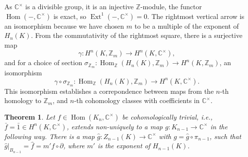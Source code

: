 \documentclass[a4paper, 10pt]{book}
\newtheorem{theorem}{Theorem}[chapter]
\theoremstyle{definition}
\numberwithin{equation}{chapter}
\newcommand\Hom{\operatorname{Hom}}
\newcommand\Ext{\operatorname{Ext}}
\newcommand\CC{\mathbb C}
\newcommand\ZZ{\mathbb Z}
\newcommand{\ra}\rightarrow
\begin{document}
 As $\CC^\times$ is a divisible group, it is an injective $\ZZ$-module, the functor $\Hom(-, \CC^\times)$ is exact, so $\Ext^1(-,\CC^\times) =0$. The rightmost vertical arrow is an isomorphism because we have chosen $m$ to be a multiple of the  exponent of $H_n(K)$. From the commutativity of the rightmost square, there is a surjective map \begin{equation}
 	\gamma: H^n(K, \ZZ _m)\rightarrow H^n(K, \CC^\times),
 \end{equation} and for a choice of section $\sigma_{\ZZ_m}: \Hom_{\ZZ}(H_n(K), \ZZ_m)\rightarrow H^n(K,\ZZ_m)$, an isomorphism \begin{equation}
 	\gamma\circ\sigma_{\ZZ_m}:\Hom_{\ZZ}(H_n(K), \ZZ_m)\rightarrow H^n(K, \CC^\times). \label{cohococycle}
 \end{equation} This isomorphism establishes a correpondence between maps from the $n$-th homology to $\ZZ_m$, and $n$-th cohomology classes with coefficients in $\CC^\times$.
\begin{theorem}\label{cochain}
Let $f\in \Hom(K_n,\CC^\times)$ be cohomologically trivial, i.e., $\bar{f} = \bar{1}\in H^n(K, \CC^\times) $,   extends non-uniquely to a map $g:K_{n-1} \rightarrow \CC^\times$ in the following way. There is a map $\hat{g}:Z_{n-1}(K)\ra \CC^\times$ with $g = \hat{g}\circ \pi_{n-1}$,  such that $\hat{g}|_{B_{n-1}} = \hat{f} = m'f\circ\partial$, where $m'$ is the exponent of $H_{n-1}(K)$.
\end{theorem}
\end{document}
